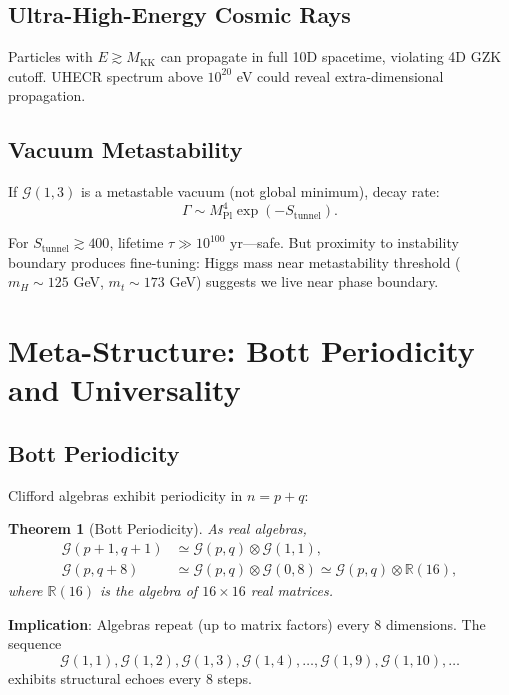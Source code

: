 \documentclass[11pt,a4paper]{article}
\numberwithin{equation}{section}
\theoremstyle{plain}
\newtheorem{theorem}{Theorem}[section]
\theoremstyle{definition}
\theoremstyle{remark}
\newcommand{\R}{\mathbb{R}}
\newcommand{\Cl}{\mathcal{G}}               %
\begin{document}
\subsection{Ultra-High-Energy Cosmic Rays}

Particles with $E \gtrsim M_{\text{KK}}$ can propagate in full 10D spacetime, violating 4D GZK cutoff. UHECR spectrum above $10^{20}$ eV could reveal extra-dimensional propagation.

\subsection{Vacuum Metastability}

If $\Cl(1,3)$ is a metastable vacuum (not global minimum), decay rate:
\begin{equation}
\Gamma \sim M_{\text{Pl}}^4 \exp(-S_{\text{tunnel}}).
\end{equation}

For $S_{\text{tunnel}} \gtrsim 400$, lifetime $\tau \gg 10^{100}$ yr—safe. But proximity to instability boundary produces fine-tuning: Higgs mass near metastability threshold ($m_H \sim 125$ GeV, $m_t \sim 173$ GeV) suggests we live near phase boundary.

\section{Meta-Structure: Bott Periodicity and Universality}
\label{sec:meta}

\subsection{Bott Periodicity}

Clifford algebras exhibit periodicity in $n = p+q$:

\begin{theorem}[Bott Periodicity]
As real algebras,
\begin{align}
\Cl(p+1,q+1) &\simeq \Cl(p,q) \otimes \Cl(1,1),\\
\Cl(p,q+8) &\simeq \Cl(p,q) \otimes \Cl(0,8) \simeq \Cl(p,q) \otimes \R(16),
\end{align}
where $\R(16)$ is the algebra of $16 \times 16$ real matrices.
\end{theorem}

\textbf{Implication}: Algebras repeat (up to matrix factors) every 8 dimensions. The sequence
\begin{equation}
\Cl(1,1), \Cl(1,2), \Cl(1,3), \Cl(1,4), \ldots, \Cl(1,9), \Cl(1,10), \ldots
\end{equation}
exhibits structural echoes every 8 steps.
\end{document}
